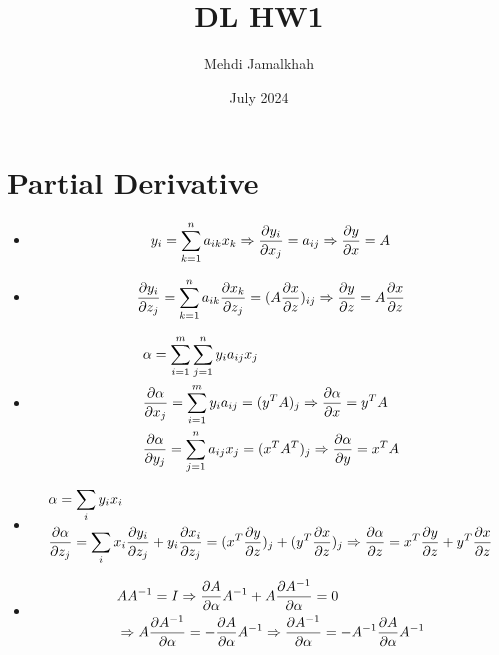\documentclass{article}
\title{DL HW1}
\author{Mehdi Jamalkhah}
\date{July 2024}
\begin{document}
\maketitle

\section{Partial Derivative}
\begin{itemize}
    \item 
    \begin{equation*}
        y_i = \sum_{k = 1}^{n} a_{ik} x_k  
        \Rightarrow \pdv{y_i}{x_j} = a_{ij}
        \Rightarrow \pdv{y}{x} = A
    \end{equation*}
    
    \item 
    \begin{equation*}
        \pdv{y_i}{z_j} = \sum_{k=1}^{n} a_{ik} \pdv{x_k}{z_j} = (A \pdv{x}{z})_{ij}
        \Rightarrow \pdv{y}{z} = A \pdv{x}{z}
    \end{equation*}    
    
    \item 
    \begin{align*}
        &\alpha = \sum_{i = 1}^{m} \sum_{j = 1}^{n} y_i a_{ij} x_j \\
        &\pdv{\alpha}{x_j} = \sum_{i = 1}^{m} y_i a_{ij} = (y^{T} A)_j
        \Rightarrow \pdv{\alpha}{x} = y^T A \\
        &\pdv{\alpha}{y_j} = \sum_{j = 1}^{n} a_{ij} x_j = (x^T A^T)_j
        \Rightarrow \pdv{\alpha}{y} = x^T A
    \end{align*}

    \item 
    \begin{align*}
        &\alpha = \sum_{i} y_i x_i \\
        &\pdv{\alpha}{z_j} = \sum_{i} x_i \pdv{y_i}{z_j} + y_i \pdv{x_i}{z_j} = (x^T \pdv{y}{z})_j + (y^T \pdv{x}{z})_j
        \Rightarrow \pdv{\alpha}{z} = x^T \pdv{y}{z} + y^T \pdv{x}{z}
    \end{align*}

    \item 
    \begin{align*}
        &AA^{-1} = I 
        \Rightarrow \pdv{A}{\alpha} A^{-1} + A\pdv{A^{-1}}{\alpha} = 0 \\
        &\Rightarrow A\pdv{A^{-1}}{\alpha} = - \pdv{A}{\alpha} A^{-1} 
        \Rightarrow \pdv{A^{-1}}{\alpha} = -A^{-1}\pdv{A}{\alpha} A^{-1}
    \end{align*}
\end{itemize}
\end{document}
